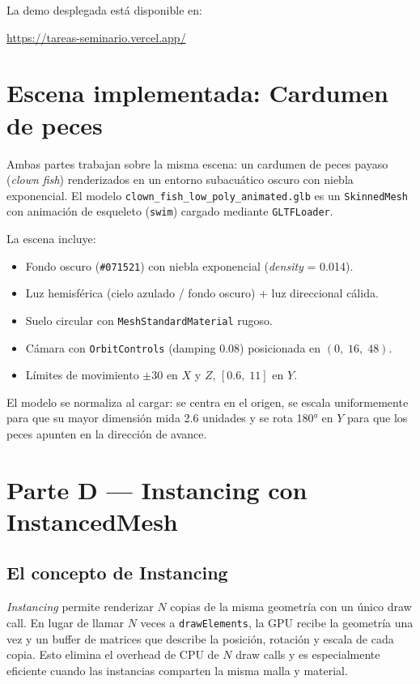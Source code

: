 \documentclass[12pt,a4paper]{article}
\begin{document}
La demo desplegada está disponible en:

\begin{center}
  \url{https://tareas-seminario.vercel.app/}
\end{center}

\section{Escena implementada: Cardumen de peces}

Ambas partes trabajan sobre la misma escena: un cardumen de peces payaso
(\textit{clown fish}) renderizados en un entorno subacuático oscuro con niebla
exponencial. El modelo \texttt{clown\_fish\_low\_poly\_animated.glb} es un
\texttt{SkinnedMesh} con animación de esqueleto (\texttt{swim}) cargado mediante
\texttt{GLTFLoader}.

La escena incluye:
\begin{itemize}[leftmargin=*]
  \item Fondo oscuro (\texttt{\#071521}) con niebla exponencial (\textit{density} = 0.014).
  \item Luz hemisférica (cielo azulado / fondo oscuro) + luz direccional cálida.
  \item Suelo circular con \texttt{MeshStandardMaterial} rugoso.
  \item Cámara con \texttt{OrbitControls} (damping 0.08) posicionada en $(0,\;16,\;48)$.
  \item Límites de movimiento $\pm 30$ en $X$ y $Z$, $[0.6,\;11]$ en $Y$.
\end{itemize}

El modelo se normaliza al cargar: se centra en el origen, se escala uniformemente
para que su mayor dimensión mida 2.6 unidades y se rota 180° en $Y$ para que los
peces apunten en la dirección de avance.

\section{Parte D — Instancing con InstancedMesh}

\subsection{El concepto de Instancing}

\textit{Instancing} permite renderizar $N$ copias de la misma geometría con un único
draw call. En lugar de llamar $N$ veces a \texttt{drawElements}, la GPU recibe la
geometría una vez y un buffer de matrices que describe la posición, rotación y escala
de cada copia. Esto elimina el overhead de CPU de $N$ draw calls y es especialmente
eficiente cuando las instancias comparten la misma malla y material.
\end{document}
